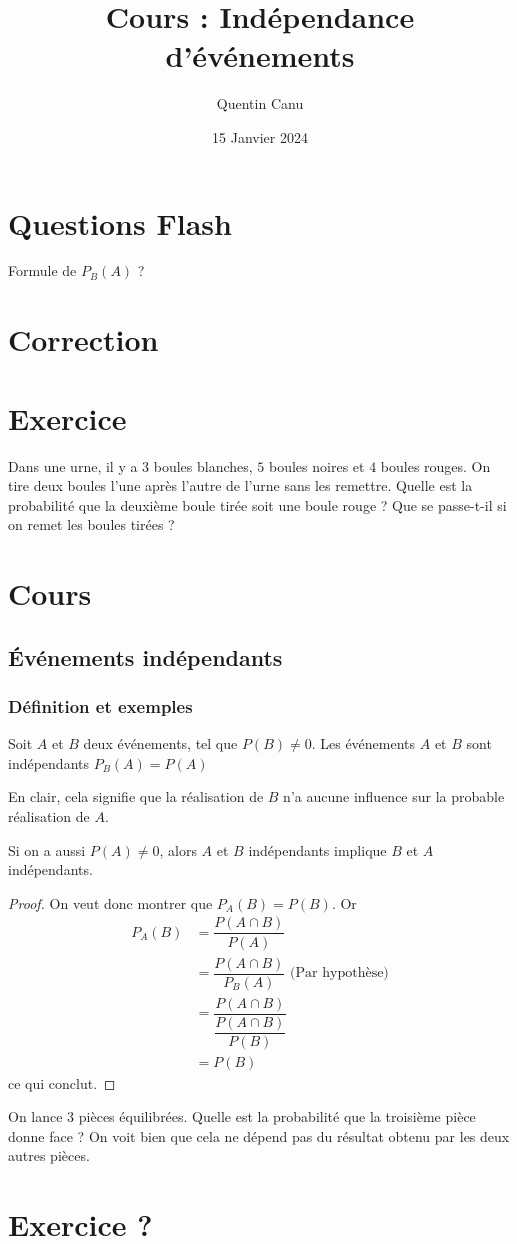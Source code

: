\documentclass{article}
\title{Cours : Indépendance d'événements}
\author{Quentin Canu}
\date{15 Janvier 2024}
\begin{document}
\maketitle
\section{Questions Flash}
Formule de $P_B(A)$ ?
\section{Correction}
\section{Exercice}
Dans une urne, il y a $3$ boules blanches, $5$ boules noires et $4$ boules rouges. On tire deux boules l'une après l'autre de l'urne sans les remettre. Quelle est la probabilité que la deuxième boule tirée soit une boule rouge ?
Que se passe-t-il si on remet les boules tirées ?
\section{Cours}
\subsection*{\'Evénements indépendants}
\subsubsection*{Définition et exemples}
\begin{definition}
Soit $A$ et $B$ deux événements, tel que $P(B) \neq 0$. Les événements $A$ et $B$ sont indépendants $P_B(A) = P(A)$   
\end{definition}
\begin{remark}
En clair, cela signifie que la réalisation de $B$ n'a aucune influence sur la probable réalisation de $A$.
\end{remark}
\begin{proposition}
Si on a aussi $P(A) \neq 0$, alors $A$ et $B$ indépendants implique $B$ et $A$ indépendants.
\end{proposition}
\begin{proof}
On veut donc montrer que $P_A(B) = P(B)$. Or
\begin{align*}
P_A(B) &= \dfrac{P(A \cap B)}{P(A)}\\
&= \dfrac{P(A \cap B)}{P_B(A)} \text{ (Par hypothèse)}\\
&= \dfrac{P(A \cap B)}{\dfrac{P(A \cap B)}{P(B)}} \\
&= P(B)
\end{align*}
ce qui conclut.
\end{proof}
\begin{example}
On lance $3$ pièces équilibrées. Quelle est la probabilité que la troisième pièce donne face ? On voit bien que cela ne dépend pas du résultat obtenu par les deux autres pièces. 
\end{example}
\section{Exercice ?}
\end{document}
